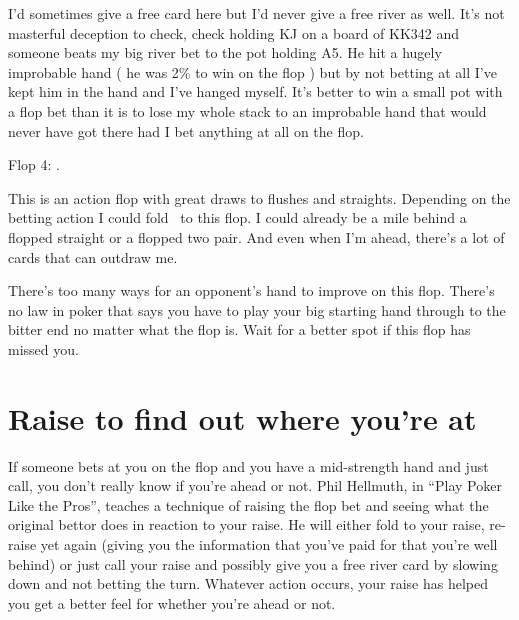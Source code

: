 I'd sometimes give a free card here but I'd never give a free river as well.
It's not masterful deception to check, check holding KJ on a board of
KK342 and someone beats my big river bet to the pot holding A5. He hit
a hugely improbable hand ( he was 2\% to win on the flop ) but by
not betting at all I've kept him in the hand and I've hanged myself.
It's better to win a small pot with a flop bet than it is to lose
my whole stack to an improbable hand that would never have got there
had I bet anything at all on the flop.

Flop 4: \tenh\nined\eigd.

This is an action flop with great draws to flushes and straights. Depending
on the betting action I could fold \Ks\Kc\ to this flop. I could already be
a mile behind a flopped straight or a flopped two pair.  And even when
I'm ahead, there's a lot of cards that can outdraw me.


There's too many ways for an opponent's hand to improve on this flop.
There's no law in poker that says you have to play your big starting
hand through to the bitter end no matter what the flop is. Wait for a
better spot if this flop has missed you.

\section{Raise to find out where you're at}

If someone bets at you on the flop and you have a mid-strength hand
and just call, you don't really know if you're ahead or not. Phil
Hellmuth, in ``Play Poker Like the Pros'', teaches a technique of
raising the flop bet and seeing what the original bettor does in
reaction to your raise. He will either fold to your raise, re-raise
yet again (giving you the information that you've paid for that you're
well behind) or just call your raise and possibly give you a free river
card by slowing down and not betting the turn.
Whatever action occurs, your raise has helped you get a better feel for
whether you're ahead or not.


